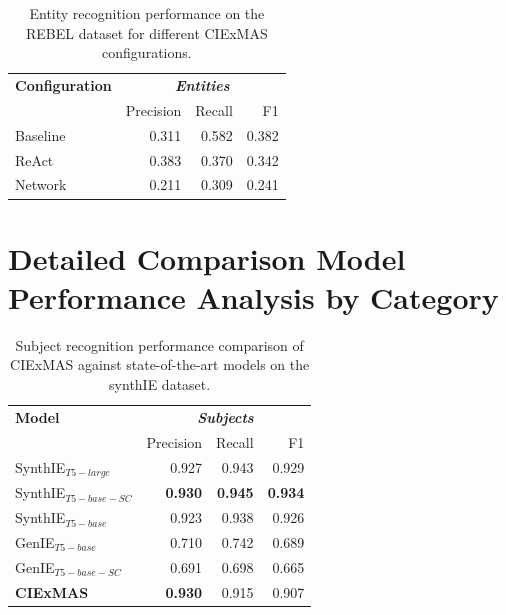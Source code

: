 \documentclass[a4paper,oneside,bibliography=totoc]{scrbook}
\begin{document}
\begin{table}[h]
  \centering
  \begin{tabular}{l|rrr}
    \toprule
    \textbf{Configuration} & \multicolumn{3}{c}{\textit{\textbf{Entities}}}                  \\
                           & Precision                                      & Recall & F1    \\
    \midrule
    Baseline               & 0.311                                          & 0.582  & 0.382 \\
    ReAct                  & 0.383                                          & 0.370  & 0.342 \\
    Network                & 0.211                                          & 0.309  & 0.241 \\
    \bottomrule
  \end{tabular}
  \caption{Entity recognition performance on the REBEL dataset for different CIExMAS configurations.}
  \label{tab:rebel_entities}
\end{table}

\newpage

\section{Detailed Comparison Model Performance Analysis by Category}
\label{sec:evaluation_results_by_category}

\begin{table}[h]
  \centering
  \begin{tabular}{l|rrr}
    \toprule
    \textbf{Model}         & \multicolumn{3}{c}{\textit{\textbf{Subjects}}}                                   \\
                           & Precision                                      & Recall         & F1             \\
    \midrule
    SynthIE$_{T5-large}$   & 0.927                                          & 0.943          & 0.929          \\
    SynthIE$_{T5-base-SC}$ & \textbf{0.930}                                 & \textbf{0.945} & \textbf{0.934} \\
    SynthIE$_{T5-base}$    & 0.923                                          & 0.938          & 0.926          \\
    GenIE$_{T5-base}$      & 0.710                                          & 0.742          & 0.689          \\
    GenIE$_{T5-base-SC}$   & 0.691                                          & 0.698          & 0.665          \\
    \midrule
    \textbf{CIExMAS}       & \textbf{0.930}                                 & 0.915          & 0.907          \\
    \bottomrule
  \end{tabular}
  \caption{Subject recognition performance comparison of CIExMAS against state-of-the-art models on the synthIE dataset.}
  \label{tab:evaluation_subjects}
\end{table}
\end{document}
